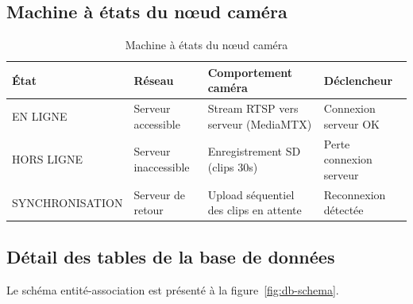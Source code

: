 \documentclass[12pt,a4paper]{article}
\begin{document}
\subsection{Machine à états du nœud caméra}

\begin{table}[H]
\centering
\small
\begin{tabular}{|l|l|l|l|}
\hline
\textbf{État} & \textbf{Réseau} & \textbf{Comportement caméra} & \textbf{Déclencheur} \\
\hline
EN LIGNE & Serveur accessible & Stream RTSP vers serveur (MediaMTX) & Connexion serveur OK \\
\hline
HORS LIGNE & Serveur inaccessible & Enregistrement SD (clips 30s) & Perte connexion serveur \\
\hline
SYNCHRONISATION & Serveur de retour & Upload séquentiel des clips en attente & Reconnexion détectée \\
\hline
\end{tabular}
\caption{Machine à états du nœud caméra}
\end{table}

\subsection{Détail des tables de la base de données}
\label{annexe:db-tables}

Le schéma entité-association est présenté à la figure~\ref{fig:db-schema}.
\end{document}
